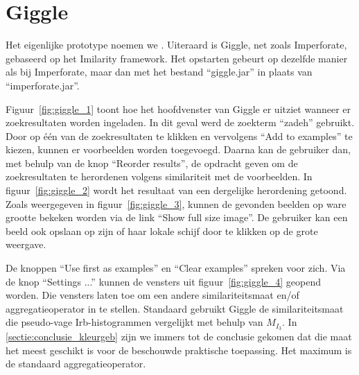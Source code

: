 \section{Giggle}

Het eigenlijke prototype noemen we . Uiteraard is Giggle, net zoals
Imperforate, gebaseerd op het Imilarity framework. Het opstarten gebeurt
op dezelfde manier als bij Imperforate, maar dan met het bestand ``giggle.jar''
in plaats van ``imperforate.jar''.

Figuur~\ref{fig:giggle_1} toont
hoe het hoofdvenster van Giggle er uitziet wanneer er zoekresultaten worden
ingeladen. In dit geval werd de zoekterm ``zadeh'' gebruikt. 
Door op \'e\'en van
de zoekresultaten te klikken en vervolgens ``Add to examples'' te kiezen,
kunnen er voorbeelden worden toegevoegd. Daarna kan de gebruiker dan, met behulp 
van de knop ``Reorder results'', de opdracht geven om de zoekresultaten te herordenen 
volgens similariteit met de voorbeelden. In figuur~\ref{fig:giggle_2} wordt het
resultaat van een dergelijke herordening getoond. Zoals weergegeven in
figuur~\ref{fig:giggle_3}, kunnen de gevonden beelden op ware grootte bekeken worden via de link 
``Show full size image''. De gebruiker kan een beeld ook opslaan op zijn of haar 
lokale schijf door te klikken op de grote weergave.

De knoppen ``Use first as examples'' en ``Clear examples'' spreken voor zich. Via
de knop ``Settings ...'' kunnen de vensters uit figuur~\ref{fig:giggle_4}
geopend worden. Die vensters laten toe om een andere similariteitsmaat en/of
aggregatieoperator in te stellen. Standaard gebruikt Giggle de similariteitsmaat 
die pseudo-vage Irb-histogrammen vergelijkt met behulp van $M_{I_3}$. 
In \ref{sectie:conclusie_kleurgeb} zijn we immers tot de conclusie gekomen dat
die maat het meest geschikt is voor de beschouwde praktische toepassing. Het maximum is
de standaard aggregatieoperator.

